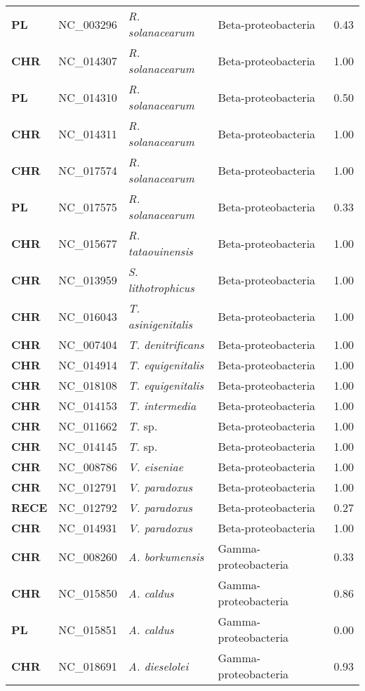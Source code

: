 \begin{adjustwidth}{-3cm}{2cm}
{\begin{supertabular}{>{\bfseries}l|p{0.1\textwidth}p{0.14\textwidth}l|l}
PL & NC\_003296 & \textit{R. solanacearum} & Beta-proteobacteria & 0.43\\
CHR & NC\_014307 & \textit{R. solanacearum} & Beta-proteobacteria & 1.00\\
PL & NC\_014310 & \textit{R. solanacearum} & Beta-proteobacteria & 0.50\\
CHR & NC\_014311 & \textit{R. solanacearum} & Beta-proteobacteria & 1.00\\
CHR & NC\_017574 & \textit{R. solanacearum} & Beta-proteobacteria & 1.00\\
PL & NC\_017575 & \textit{R. solanacearum} & Beta-proteobacteria & 0.33\\
CHR & NC\_015677 & \textit{R. tataouinensis} & Beta-proteobacteria & 1.00\\
CHR & NC\_013959 & \textit{S. lithotrophicus} & Beta-proteobacteria & 1.00\\
CHR & NC\_016043 & \textit{T. asinigenitalis} & Beta-proteobacteria & 1.00\\
CHR & NC\_007404 & \textit{T. denitrificans} & Beta-proteobacteria & 1.00\\
CHR & NC\_014914 & \textit{T. equigenitalis} & Beta-proteobacteria & 1.00\\
CHR & NC\_018108 & \textit{T. equigenitalis} & Beta-proteobacteria & 1.00\\
CHR & NC\_014153 & \textit{T. intermedia} & Beta-proteobacteria & 1.00\\
CHR & NC\_011662 & \textit{T. }sp. & Beta-proteobacteria & 1.00\\
CHR & NC\_014145 & \textit{T. }sp. & Beta-proteobacteria & 1.00\\
CHR & NC\_008786 & \textit{V. eiseniae} & Beta-proteobacteria & 1.00\\
CHR & NC\_012791 & \textit{V. paradoxus} & Beta-proteobacteria & 1.00\\
RECE & NC\_012792 & \textit{V. paradoxus} & Beta-proteobacteria & 0.27\\
CHR & NC\_014931 & \textit{V. paradoxus} & Beta-proteobacteria & 1.00\\
CHR & NC\_008260 & \textit{A. borkumensis} & Gamma-proteobacteria & 0.33\\
CHR & NC\_015850 & \textit{A. caldus} & Gamma-proteobacteria & 0.86\\
PL & NC\_015851 & \textit{A. caldus} & Gamma-proteobacteria & 0.00\\
CHR & NC\_018691 & \textit{A. dieselolei} & Gamma-proteobacteria & 0.93\\

\end{supertabular}}
\end{adjustwidth}
